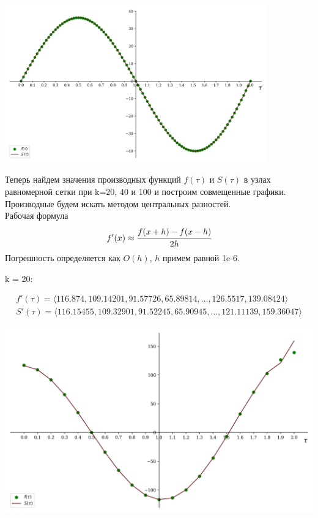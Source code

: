 \documentclass[a4paper, 14pt]{extarticle}
\begin{document}
\begin{center}
    \includegraphics[width=0.85\textwidth]{main_x_spline_100}
\end{center}

Теперь найдем значения производных функций $f(\tau)$ и $S(\tau)$ в узлах равномерной 
сетки при k=20, 40 и 100 и построим совмещенные графики.\\

Производные будем искать методом центральных разностей.\\
Рабочая формула
\begin{equation*}
  f'(x) \approx \cfrac{f(x+h) - f(x-h)}{2h}
\end{equation*}
Погрешность определяется как $O(h)$, $h$ примем равной 1e-6.\\

\vfill

k = 20:

\begin{gather*}
    f'(\tau) = \langle 116.874, 109.14201, 91.57726, 65.89814, \dots, 126.5517, 139.08424 \rangle \\
    S'(\tau) = \langle 116.15455, 109.32901, 91.52245, 65.90945, \dots, 121.11139, 159.36047 \rangle 
\end{gather*}
 
\begin{center}
    \includegraphics[width=1\textwidth]{mainDiff_x_splineDiff_20}
\end{center}
\end{document}
